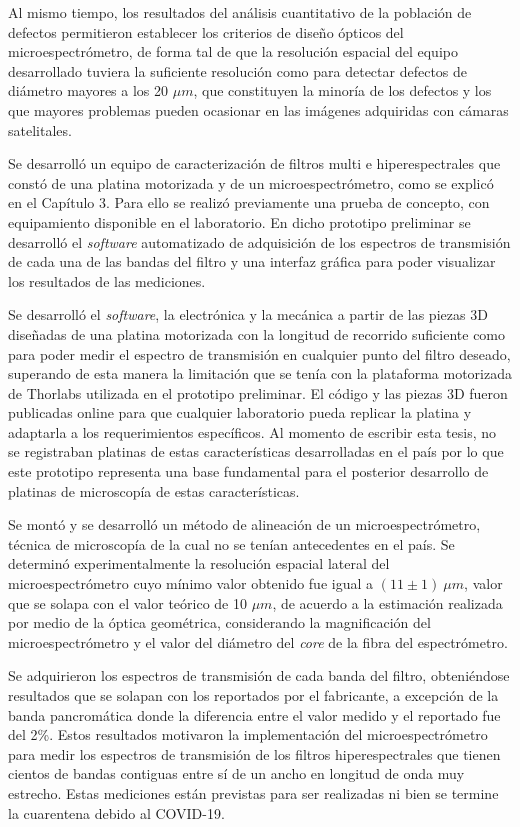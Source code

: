 Al mismo tiempo, los resultados del análisis cuantitativo de la población de defectos permitieron establecer los criterios de diseño ópticos del microespectrómetro, de forma tal de que la resolución espacial del equipo desarrollado tuviera la suficiente resolución como para detectar defectos de diámetro mayores a los 20 $\mu m$, que constituyen la minoría de los defectos y los que mayores problemas pueden ocasionar en las imágenes adquiridas con cámaras satelitales.

Se desarrolló un equipo de caracterización de filtros multi e hiperespectrales que constó de una platina motorizada y de un microespectrómetro, como se explicó en el Capítulo 3. Para ello se realizó previamente una prueba de concepto, con equipamiento disponible en el laboratorio. En dicho prototipo preliminar se desarrolló el \textit{software} automatizado de adquisición de los espectros de transmisión de cada una de las bandas del filtro y una interfaz gráfica para poder visualizar los resultados de las mediciones.

Se desarrolló el \textit{software}, la electrónica y la mecánica a partir de las piezas 3D diseñadas de una platina motorizada con la longitud de recorrido suficiente como para poder medir el espectro de transmisión en cualquier punto del filtro deseado, superando de esta manera la limitación que se tenía con la plataforma motorizada de Thorlabs utilizada en el prototipo preliminar. El código y las piezas 3D fueron publicadas online para que cualquier laboratorio pueda replicar la platina y adaptarla a los requerimientos específicos. Al momento de escribir esta tesis, no se registraban platinas de estas características desarrolladas en el país por lo que este prototipo representa una base fundamental para el posterior desarrollo de platinas de microscopía de estas características.

Se montó y se desarrolló un método de alineación de un microespectrómetro, técnica de microscopía de la cual no se tenían antecedentes en el país. Se determinó experimentalmente la resolución espacial lateral del microespectrómetro cuyo mínimo valor obtenido fue igual a $(11 \pm 1)~\mu m$, valor que se solapa con el valor  teórico de 10 $\mu m$, de acuerdo a la estimación realizada por medio de la óptica geométrica, considerando la magnificación del microespectrómetro y el valor del diámetro del \textit{core} de la fibra del espectrómetro.

Se adquirieron los espectros de transmisión de cada banda del filtro, obteniéndose resultados que se solapan con los reportados por el fabricante, a excepción de la banda pancromática donde la diferencia entre el valor medido y el reportado fue del 2\%. Estos resultados motivaron la implementación del microespectrómetro para medir los espectros de transmisión de los filtros hiperespectrales que tienen cientos de bandas contiguas entre sí de un ancho en longitud de onda muy estrecho. Estas mediciones están previstas para ser realizadas ni bien se termine la cuarentena debido al COVID-19.

